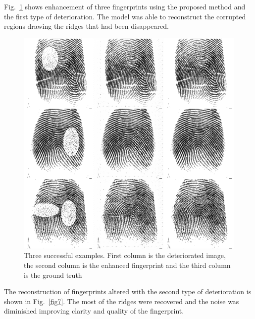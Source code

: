 \documentclass[a4paper,fleqn]{cas-dc}
\begin{document}
Fig.~\ref{fig6} shows enhancement of three fingerprints using the proposed method and the first type of deterioration. The model was able to reconstruct the corrupted regions drawing the ridges that had been disappeared.

\begin{figure}[htbp]
\centerline{\includegraphics[scale=0.28]{figs/recons_1.png}}
\caption{Three successful examples. First column is the deteriorated image, the second column is the enhanced fingerprint and the third column is the ground truth}
\label{fig6}
\end{figure}

The reconstruction of fingerprints altered with the second type of deterioration is shown in Fig.~\ref{fig7}. The most of the ridges were recovered and the noise was diminished improving clarity and quality of the fingerprint.
\end{document}
